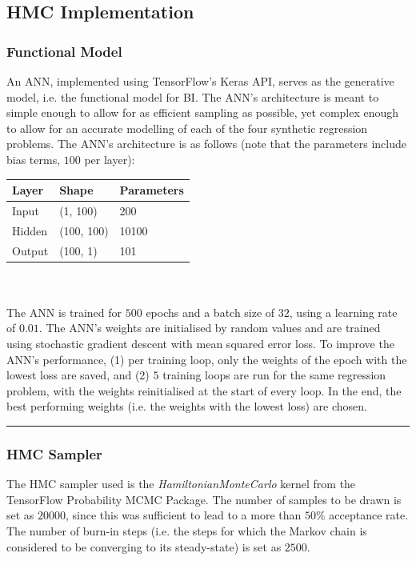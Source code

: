 \documentclass[conference]{IEEEtran}
\begin{document}
\subsection{HMC Implementation}
\subsubsection{Functional Model}
An ANN, implemented using TensorFlow's Keras API, serves as the generative model, i.e. the functional model for BI. The ANN's architecture is meant to simple enough to allow for as efficient sampling as possible, yet complex enough to allow for an accurate modelling of each of the four synthetic regression problems. The ANN's architecture is as follows (note that the parameters include bias terms, $100$ per layer):\\

\begin{tabular}{| m{1cm} | m{1.5cm} | m{2cm} |}
    \hline
    \textbf{Layer} & \textbf{Shape} & \textbf{Parameters}\\
    \hline
    Input & (1, 100) & 200\\
    \hline
    Hidden & (100, 100) & 10100\\
    \hline
    Output & (100, 1) & 101\\
    \hline
\end{tabular}\\~\\

The ANN is trained for $500$ epochs and a batch size of $32$, using a learning rate of $0.01$. The ANN's weights are initialised by random values and are trained using stochastic gradient descent with mean squared error loss. To improve the ANN's performance, (1) per training loop, only the weights of the epoch with the lowest loss are saved, and (2) $5$ training loops are run for the same regression problem, with the weights reinitialised at the start of every loop. In the end, the best performing weights (i.e. the weights with the lowest loss) are chosen.

\par\noindent\rule{0.49\textwidth}{0.1pt}

\subsubsection{HMC Sampler}
The HMC sampler used is the \textit{HamiltonianMonteCarlo} kernel from the TensorFlow Probability MCMC Package. The number of samples to be drawn is set as $20000$, since this was sufficient to lead to a more than $50\%$ acceptance rate. The number of burn-in steps (i.e. the steps for which the Markov chain is considered to be converging to its steady-state) is set as $2500$.\\
\end{document}

